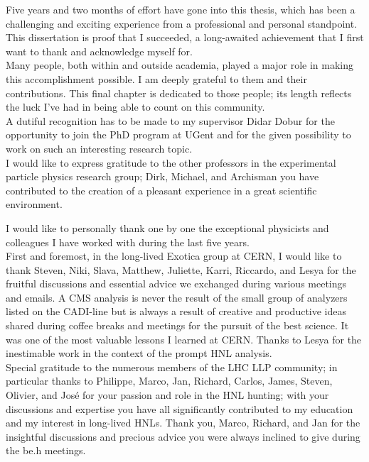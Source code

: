 
\begin{acknowledgements}
\addchaptertocentry{\acknowledgementname} %


Five years and two months of effort have gone into this thesis, which has been a challenging and exciting experience from a professional and personal standpoint.
This dissertation is proof that I succeeded, a long-awaited achievement that I first want to thank and acknowledge myself for. \\
Many people, both within and outside academia, played a major role in making this accomplishment possible. I am deeply grateful to them and their contributions. This final chapter is dedicated to those people; its length reflects the luck I've had in being able to count on this community.\\

A dutiful recognition has to be made to my supervisor Didar Dobur for the opportunity to join the PhD program at UGent and for the given possibility to work on such an interesting research topic. \\
I would like to express gratitude to the other professors in the experimental particle physics research group; Dirk, Michael, and Archisman you have contributed to the creation of a pleasant experience in a great scientific environment. 

I would like to personally thank one by one the exceptional physicists and colleagues I have worked with during the last five years.\\
First and foremost, in the long-lived Exotica group at CERN, I would like to thank Steven, Niki, Slava, Matthew, Juliette, Karri, Riccardo, and Lesya for the fruitful discussions and essential advice we exchanged during various meetings and emails. A CMS analysis is never the result of the small group of analyzers listed on the CADI-line but is always a result of creative and productive ideas shared during coffee breaks and meetings for the pursuit of the best science. It was one of the most valuable lessons I learned at CERN. Thanks to Lesya for the inestimable work in the context of the prompt HNL analysis.\\
Special gratitude to the numerous members of the LHC LLP community; in particular thanks to Philippe, Marco, Jan, Richard, Carlos, James, Steven, Olivier, and Jos\'e for your passion and role in the HNL hunting; with your discussions and expertise you have all significantly contributed to my education and my interest in long-lived HNLs. Thank you, Marco, Richard, and Jan for the insightful discussions and precious advice you were always inclined to give during the be.h meetings.  \\


\end{acknowledgements}

